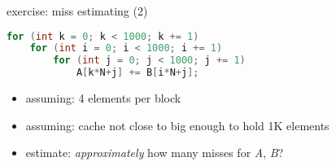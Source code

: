 \begin{frame}[fragile,label=missEstExer2]{exercise: miss estimating (2)}
\begin{lstlisting}[language=C++,style=small]
for (int k = 0; k < 1000; k += 1)
    for (int i = 0; i < 1000; i += 1)
        for (int j = 0; j < 1000; j += 1)
            A[k*N+j] += B[i*N+j];
\end{lstlisting}
\begin{itemize}
\item assuming: 4 elements per block
\item assuming: cache not close to big enough to hold 1K elements
\vspace{.5cm}
\item estimate: \textit{approximately} how many misses for \textit{A}, \textit{B}?
\end{itemize}
\end{frame}
